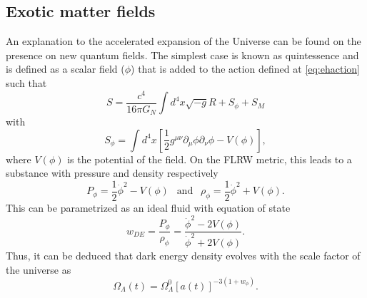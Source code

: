 \subsection{Exotic matter fields}
An explanation to the accelerated expansion of the Universe can be found on the presence on new quantum fields. The simplest case is known as quintessence and is defined as a scalar field  ($\phi$) that is added to the action defined at \autoref{eq:ehaction} such that
\begin{equation}
S = \frac{c^4}{16\pi G_N}\int d^4x\sqrt{-g}R+S_\phi+S_M
\end{equation}
with
\begin{equation}
S_\phi = \int d^4x\left[\frac{1}{2}g^{\mu\nu}\partial_\mu\phi\partial_\nu\phi-V(\phi)\right],
\end{equation}
where $V(\phi)$ is the potential of the field. On the FLRW metric, this leads to a substance with pressure and density respectively 
\begin{equation}
P_\phi = \frac{1}{2}\dot\phi^2-V(\phi)\ \ \mbox{ and }\ \ \rho_\phi=\frac{1}{2}\dot\phi^2+V(\phi).
\end{equation}
This can be parametrized as an ideal fluid with equation of state
\begin{equation}
w_{DE} = \frac{P_\phi}{\rho_\phi} = \frac{\dot\phi^2-2V(\phi)}{\dot\phi^2+2V(\phi)}.
\end{equation}
Thus, it can be deduced that dark energy density evolves with the scale factor of the universe as
\begin{equation}
\Omega_\Lambda(t) = \Omega_\Lambda^0 [a(t)]^{-3(1+w_\phi)}.
\end{equation}
\newline

